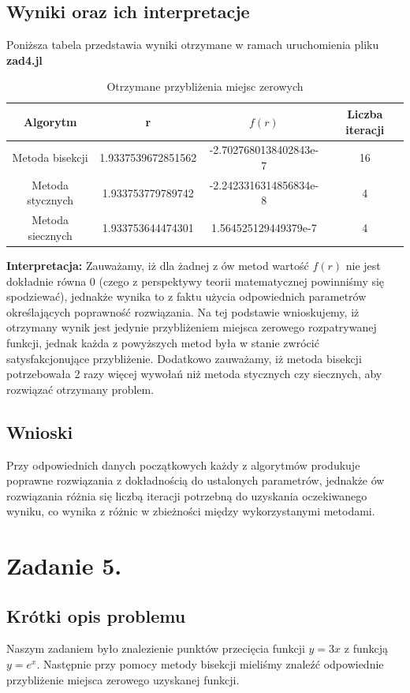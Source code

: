 \documentclass[a4paper,14pt]{report}
\begin{document}
  \section{Wyniki oraz ich interpretacje}
  Poniższa tabela przedstawia wyniki otrzymane w ramach uruchomienia pliku \textbf{zad4.jl} \\
  \begin{table}[H]
    \centering
    \begin{tabular}{|c | c | c | c |} 
     \hline
     Algorytm & r & $f(r)$ & Liczba iteracji \\ [0.5ex] 
     \hline\hline
     Metoda bisekcji & 1.9337539672851562 & -2.7027680138402843e-7 & 16  \\ 
     Metoda stycznych & 1.933753779789742 & -2.2423316314856834e-8 & 4\\
     Metoda siecznych & 1.933753644474301 & 1.564525129449379e-7 & 4\\
     \hline
    \end{tabular}
    \caption{Otrzymane przybliżenia miejsc zerowych}
    \label{Zad4Wyniki}
    \end{table}
    \textbf{Interpretacja: }Zauważamy, iż dla żadnej z ów metod wartość $f(r)$ nie jest dokładnie równa 0 (czego z perspektywy teorii matematycznej powinniśmy się spodziewać), jednakże wynika to z faktu użycia odpowiednich parametrów określających poprawność rozwiązania. Na tej podstawie wnioskujemy, iż otrzymany wynik jest jedynie przybliżeniem miejsca zerowego rozpatrywanej funkcji, jednak każda z powyższych metod była w stanie zwrócić satysfakcjonujące przybliżenie. Dodatkowo zauważamy, iż metoda bisekcji potrzebowała 2 razy więcej wywołań niż metoda stycznych czy siecznych, aby rozwiązać otrzymany problem.
  \section{Wnioski}
    Przy odpowiednich danych początkowych każdy z algorytmów produkuje poprawne rozwiązania z dokładnością do ustalonych parametrów, jednakże ów rozwiązania różnia się liczbą iteracji potrzebną do uzyskania oczekiwanego wyniku, co wynika z różnic w zbieżności między wykorzystanymi metodami.
\chapter{Zadanie 5.}
  \section{Krótki opis problemu}
    Naszym zadaniem było znalezienie punktów przecięcia funkcji $y=3x$ z funkcją $y=e^{x}$. Następnie przy pomocy metody bisekcji mieliśmy znaleźć odpowiednie przybliżenie miejsca zerowego uzyskanej funkcji.
\end{document}
